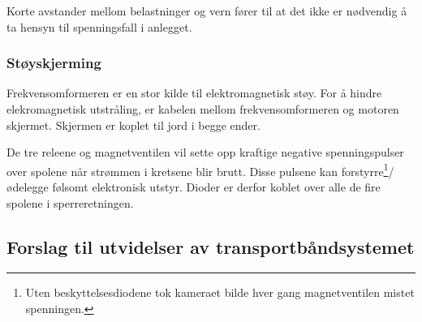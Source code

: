 \documentclass[Visionprosjekt.tex]{subfiles}
\begin{document}
Korte avstander mellom belastninger og vern fører til at det ikke er nødvendig å ta hensyn til spenningsfall i anlegget. 



\subsubsection{Støyskjerming}

Frekvensomformeren er  en stor kilde til elektromagnetisk støy. For å hindre elekromagnetisk utstråling, er kabelen mellom frekvensomformeren og motoren skjermet. Skjermen er koplet til jord i begge ender. %

De tre releene og magnetventilen vil sette opp kraftige negative spenningspulser over spolene når strømmen i kretsene blir brutt. Disse pulsene kan  forstyrre\footnote{Uten beskyttelsesdiodene tok kameraet bilde hver gang magnetventilen mistet spenningen.}/ødelegge følsomt elektronisk utstyr. Dioder er derfor koblet over alle de fire spolene i sperreretningen.


%
%
%
%
%





\subsection{Forslag til utvidelser av transportbåndsystemet}
\end{document}
